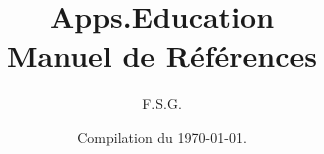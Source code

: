\documentclass[a4paper, 11pt]{book}
\title{Apps.Education\\Manuel de Références}
\author{F.S.G.}
\date{Compilation du \today{}.}
\renewcommand{\baselinestretch}{1.25}
\begin{document}
\begin{titlepage}
    \maketitle
\end{titlepage}

















\setcounter{chapter}{0}
\renewcommand{\chaptername}{Fiche}
\renewcommand{\thechapter}{\Alph{chapter}}



\newpage
\renewcommand{\baselinestretch}{1}
\setlength{\parskip}{0em}
\tableofcontents

\listoffigures
\end{document}
